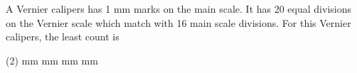 
\item A Vernier calipers has 1 mm marks on the main scale. It has 20 equal divisions on the Vernier scale which match with 16 main scale divisions. For this Vernier calipers, the least count is
  \begin{tasks}(2)
     mm
     mm
     mm
     mm\ans
  \end{tasks}
